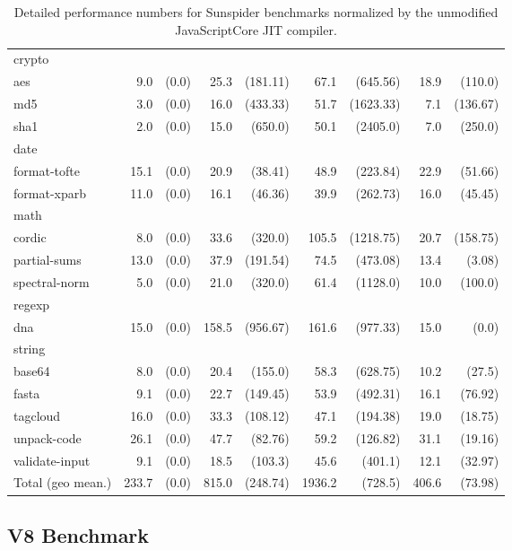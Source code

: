 \begin{table}[h!]
{\begin{tabular}{l|rr|rr|rr|rr}
crypto&&&&&&&& \\
\quad aes & 9.0 & (0.0) & 25.3 & (181.11) & 67.1 & (645.56) & 18.9 & (110.0) \\
\quad md5 & 3.0 & (0.0) & 16.0 & (433.33) & 51.7 & (1623.33) & 7.1 & (136.67) \\
\quad sha1 & 2.0 & (0.0) & 15.0 & (650.0) & 50.1 & (2405.0) & 7.0 & (250.0) \\
date&&&&&&&& \\
\quad format-tofte & 15.1 & (0.0) & 20.9 & (38.41) & 48.9 & (223.84) & 22.9 & (51.66) \\
\quad format-xparb & 11.0 & (0.0) & 16.1 & (46.36) & 39.9 & (262.73) & 16.0 & (45.45) \\
math&&&&&&&& \\
\quad cordic & 8.0 & (0.0) & 33.6 & (320.0) & 105.5 & (1218.75) & 20.7 & (158.75) \\
\quad partial-sums & 13.0 & (0.0) & 37.9 & (191.54) & 74.5 & (473.08) & 13.4 & (3.08) \\
\quad spectral-norm & 5.0 & (0.0) & 21.0 & (320.0) & 61.4 & (1128.0) & 10.0 & (100.0) \\
regexp&&&&&&&& \\
\quad dna & 15.0 & (0.0) & 158.5 & (956.67) & 161.6 & (977.33) & 15.0 & (0.0) \\
string&&&&&&&& \\
\quad base64 & 8.0 & (0.0) & 20.4 & (155.0) & 58.3 & (628.75) & 10.2 & (27.5) \\
\quad fasta & 9.1 & (0.0) & 22.7 & (149.45) & 53.9 & (492.31) & 16.1 & (76.92) \\
\quad tagcloud & 16.0 & (0.0) & 33.3 & (108.12) & 47.1 & (194.38) & 19.0 & (18.75) \\
\quad unpack-code & 26.1 & (0.0) & 47.7 & (82.76) & 59.2 & (126.82) & 31.1 & (19.16) \\
\quad validate-input & 9.1 & (0.0) & 18.5 & (103.3) & 45.6 & (401.1) & 12.1 & (32.97) \\
\hline
Total (geo mean.) & 233.7 & (0.0) & 815.0 & (248.74) & 1936.2 & (728.5) & 406.6 & (73.98) \\
\bottomrule
\end{tabular}
}
\caption{Detailed performance numbers for Sunspider benchmarks normalized by the unmodified JavaScriptCore JIT compiler.}
\label{tab:jitflow-performance-sunspider}
\end{table}

\newpage
\subsection{V8 Benchmark}

